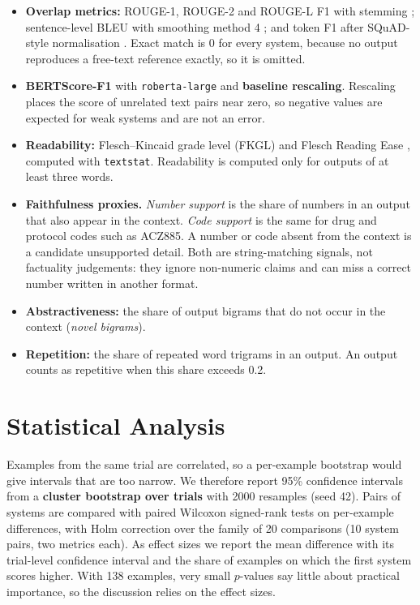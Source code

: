 \begin{itemize}
    \item \textbf{Overlap metrics:} ROUGE-1, ROUGE-2 and ROUGE-L F1 with stemming \parencite{lin2004rouge}; sentence-level BLEU \parencite{papineni2002bleu} with smoothing method 4 \parencite{chen2014smoothing}; and token F1 after SQuAD-style normalisation \parencite{rajpurkar2016squad}. Exact match is 0 for every system, because no output reproduces a free-text reference exactly, so it is omitted.
    \item \textbf{BERTScore-F1} \parencite{zhang2020bertscore} with \texttt{roberta-large} and \textbf{baseline rescaling}. Rescaling places the score of unrelated text pairs near zero, so negative values are expected for weak systems and are not an error.
    \item \textbf{Readability:} Flesch--Kincaid grade level (FKGL) \parencite{kincaid1975} and Flesch Reading Ease \parencite{flesch1948}, computed with \texttt{textstat}. Readability is computed only for outputs of at least three words.
    \item \textbf{Faithfulness proxies.} \emph{Number support} is the share of numbers in an output that also appear in the context. \emph{Code support} is the same for drug and protocol codes such as ACZ885. A number or code absent from the context is a candidate unsupported detail. Both are string-matching signals, not factuality judgements: they ignore non-numeric claims and can miss a correct number written in another format.
    \item \textbf{Abstractiveness:} the share of output bigrams that do not occur in the context (\emph{novel bigrams}).
    \item \textbf{Repetition:} the share of repeated word trigrams in an output. An output counts as repetitive when this share exceeds 0.2.
\end{itemize}

\section{Statistical Analysis}

Examples from the same trial are correlated, so a per-example bootstrap would give intervals that are too narrow. We therefore report 95\% confidence intervals from a \textbf{cluster bootstrap over trials} \parencite{efron1994bootstrap} with 2000 resamples (seed 42). Pairs of systems are compared with paired Wilcoxon signed-rank tests \parencite{wilcoxon1945} on per-example differences, with Holm correction \parencite{holm1979} over the family of 20 comparisons (10 system pairs, two metrics each). As effect sizes we report the mean difference with its trial-level confidence interval and the share of examples on which the first system scores higher. With 138 examples, very small $p$-values say little about practical importance, so the discussion relies on the effect sizes.


